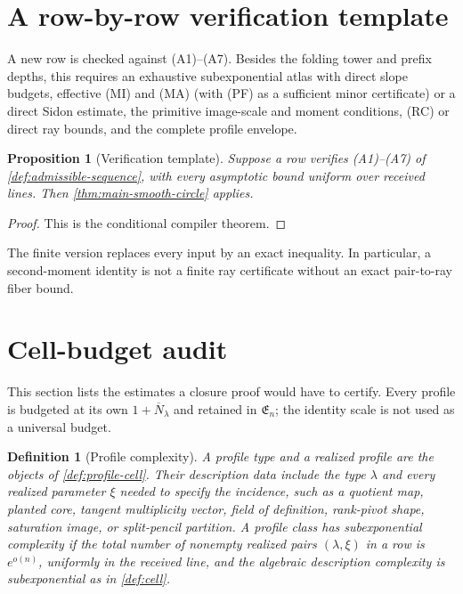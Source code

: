 \documentclass[12pt,a4paper]{amsart}
\numberwithin{equation}{section}
\newtheorem{proposition}[proposition]{Proposition}
\newtheorem{definition}[definition]{Definition}
\theoremstyle{remark}
\newcommand{\barN}{\overline N}
\begin{document}
\section{A row-by-row verification template}\label{sec:verification-template}

A new row is checked against \textup{(A1)}--\textup{(A7)}.  Besides the
folding tower and prefix depths, this requires an exhaustive
subexponential atlas with direct slope budgets, effective \textup{(MI)} and
\textup{(MA)} (with \textup{(PF)} as a sufficient minor certificate) or
a direct Sidon estimate, the primitive image-scale and
moment conditions, \textup{(RC)} or direct ray bounds, and the complete
profile envelope.

\begin{proposition}[Verification template]\label{prop:verification-template}
Suppose a row verifies \textup{(A1)}--\textup{(A7)} of
\cref{def:admissible-sequence}, with every asymptotic bound uniform over
received lines.  Then \cref{thm:main-smooth-circle} applies.
\end{proposition}

\begin{proof}
This is the conditional compiler theorem.
\end{proof}

The finite version replaces every input by an exact inequality.  In
particular, a second-moment identity is not a finite ray certificate without
an exact pair-to-ray fiber bound.

\section{Cell-budget audit}\label{sec:complete-cell-budgets}

This section lists the estimates a closure proof would have to certify.
Every profile is budgeted at its own \(1+\barN_\lambda\) and retained in
\(\mathfrak E_n\); the identity scale is not used as a universal budget.

\begin{definition}[Profile complexity]\label{def:profile-complexity}
A profile type and a realized profile are the objects of
\cref{def:profile-cell}.  Their description data include the type
\(\lambda\) and every realized parameter \(\xi\) needed to specify the
incidence, such as a quotient map, planted core, tangent multiplicity
vector, field of definition, rank-pivot shape, saturation image, or
split-pencil partition.  A profile class has subexponential complexity if
the total number of nonempty realized pairs \((\lambda,\xi)\) in a row is
\(e^{o(n)}\), uniformly in the received line, and the algebraic description
complexity is subexponential as in \cref{def:cell}.
\end{definition}
\end{document}
